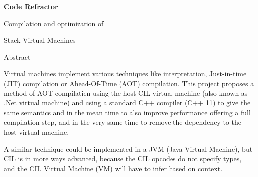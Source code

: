 \documentclass[letterpaper]{article}
\title{}
\author{}
\date{2013-08-22}
\begin{document}
\clearpage\setcounter{page}{1}\pagestyle{Standard}

\bigskip


\bigskip


\bigskip


\bigskip


\bigskip


\bigskip


\bigskip


\bigskip


\bigskip


\bigskip


\bigskip


\bigskip


\bigskip


\bigskip


\bigskip


\bigskip


\bigskip


\bigskip


\bigskip


\bigskip


\bigskip


\bigskip

{\centering\sffamily\bfseries
Code Refractor 
\par}

{\centering
Compilation and optimization of 
\par}

{\centering
Stack Virtual Machines
\par}


\bigskip

\clearpage
Abstract


\bigskip

Virtual machines implement various techniques like interpretation, Just-in-time (JIT) compilation or Ahead-Of-Time (AOT)
compilation. This project proposes a method of AOT compilation using the host CIL virtual machine (also known as .Net
{\texttrademark} virtual machine) and using a standard C++ compiler (C++ 11) to give the same semantics and in the mean
time to also improve performance offering a full compilation step, and in the very same time to remove the dependency
to the host virtual machine. 


\bigskip

A similar technique could be implemented in a JVM (Java Virtual Machine), but CIL is in more ways advanced, because the
CIL opcodes do not specify types, and the CIL Virtual Machine (VM) will have to infer based on context. \ 
\end{document}
